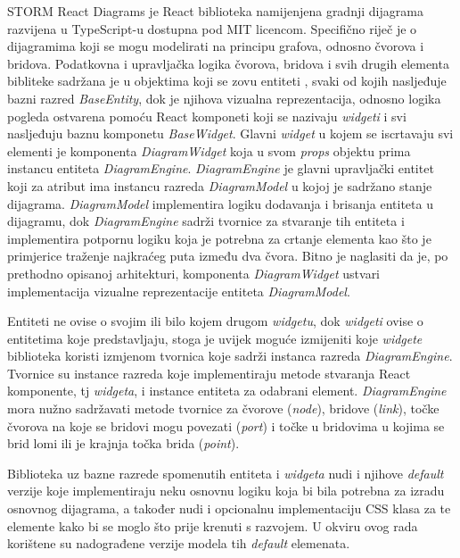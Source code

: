\documentclass[times, utf8, diplomski, numeric]{fer}
\begin{document}
STORM React Diagrams je React biblioteka namijenjena gradnji dijagrama razvijena u TypeScript-u dostupna pod MIT licencom.
Specifično riječ je o dijagramima koji se mogu modelirati na principu grafova, odnosno čvorova i bridova.
Podatkovna i upravljačka logika čvorova, bridova i svih drugih elementa bibliteke sadržana je u objektima koji se zovu entiteti , svaki od kojih nasljeđuje bazni razred \emph{BaseEntity}, dok je njihova vizualna reprezentacija, odnosno logika pogleda  ostvarena pomoću React komponeti koji se nazivaju \emph{widgeti} i svi nasljeđuju baznu komponetu \emph{BaseWidget}.
Glavni \emph{widget} u kojem se iscrtavaju svi elementi je komponenta \emph{DiagramWidget} koja u svom \emph{props} objektu prima instancu entiteta \emph{DiagramEngine}.
\emph{DiagramEngine} je glavni upravljački entitet koji za atribut ima instancu razreda \emph{DiagramModel} u kojoj je sadržano stanje dijagrama.
\emph{DiagramModel} implementira logiku dodavanja i brisanja entiteta u dijagramu, dok \emph{DiagramEngine} sadrži tvornice  za stvaranje tih entiteta i implementira potpornu logiku koja je potrebna za crtanje elementa kao što je primjerice traženje najkraćeg puta između dva čvora.
Bitno je naglasiti da je, po prethodno opisanoj arhitekturi, komponenta \emph{DiagramWidget} ustvari implementacija vizualne reprezentacije entiteta \emph{DiagramModel}.

Entiteti ne ovise o svojim ili bilo kojem drugom \emph{widgetu}, dok \emph{widgeti} ovise o entitetima koje predstavljaju, stoga je uvijek moguće izmijeniti koje \emph{widgete} biblioteka koristi izmjenom tvornica koje sadrži instanca razreda \emph{DiagramEngine}.
Tvornice su instance razreda koje implementiraju metode stvaranja React komponente, tj \emph{widgeta}, i instance entiteta za odabrani element.
\emph{DiagramEngine} mora nužno sadržavati metode tvornice za čvorove (\emph{node}), bridove (\emph{link}), točke čvorova na koje se bridovi mogu povezati (\emph{port}) i točke u bridovima u kojima se brid lomi ili je krajnja točka brida (\emph{point}).

Biblioteka uz bazne razrede spomenutih entiteta i \emph{widgeta} nudi i njihove \emph{default} verzije koje implementiraju neku osnovnu logiku koja bi bila potrebna za izradu osnovnog dijagrama, a također nudi i opcionalnu implementaciju CSS klasa za te elemente kako bi se moglo što prije krenuti s razvojem\citep{storm_rd}.
U okviru ovog rada korištene su nadograđene verzije modela tih \emph{default} elemenata.
\end{document}
